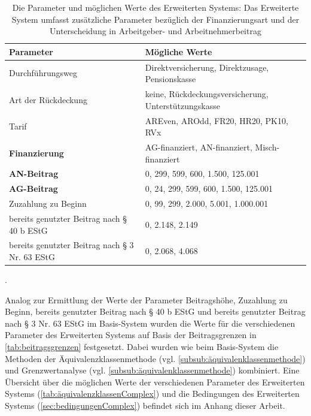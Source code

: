 \begin{table}[htb!]
\footnotesize
\begin{tabularx}{\textwidth}{|X|l|}
\hline
\cellcolor{grauinfo}Parameter                                      & \cellcolor{grauinfo}Mögliche Werte                                       \\ \hline
Durchführungsweg                               & Direktversicherung, Direktzusage, Pensionskasse      \\ \hline
Art der Rückdeckung                            & keine, Rückdeckungsversicherung, Unterstützungskasse \\ \hline
Tarif                                          & AREven, AROdd, FR20, HR20, PK10, RVx                 \\ \hline
\textbf{Finanzierung}								   &AG-finanziert, AN-finanziert, Misch-finanziert     \\ \hline
\textbf{AN-Beitrag}                                    & 0, 299, 599, 600, 1.500, 125.001                     \\ \hline
\textbf{AG-Beitrag }                                    & 0, 24, 299, 599, 600, 1.500, 125.001                   \\ \hline
Zuzahlung zu Beginn                            & 0, 99, 299, 2.000, 5.001, 1.000.001                  \\ \hline
bereits genutzter Beitrag nach § 40 b EStG     & 0, 2.148, 2.149                                      \\ \hline
bereits genutzter Beitrag nach § 3 Nr. 63 EStG & 0, 2.068, 4.068                                      \\ \hline
\end{tabularx}
\normalsize
\caption{Die Parameter und möglichen Werte des Erweiterten Systems: Das Erweiterte System umfasst zusätzliche Parameter bezüglich der Finanzierungsart und der Unterscheidung in Arbeitgeber- und Arbeitnehmerbeitrag}.
\label{tab:sutComplex}
\end{table}

Analog zur Ermittlung der Werte der Parameter Beitragshöhe, Zuzahlung zu Beginn, bereits genutzter Beitrag nach § 40 b EStG und bereits genutzter Beitrag nach § 3 Nr. 63 EStG im Basis-System wurden die Werte für die verschiedenen Parameter des Erweiterten Systems auf Basis der Beitragsgrenzen in \autoref{tab:beitragsgrenzen} festgesetzt. Dabei wurden wie beim Basis-System die Methoden der Äquivalenzklassenmethode (vgl. \autoref{subsub:äquivalenklassenmethode}) und Grenzwertanalyse (vgl. \autoref{subsub:äquivalenklassenmethode}) kombiniert. Eine Übersicht über die möglichen Werte der verschiedenen Parameter des Erweiterten Systems (\autoref{tab:äquivalenzklassenComplex}) und die Bedingungen des Erweiterten Systems (\autoref{sec:bedingungenComplex}) befindet sich im Anhang dieser Arbeit.

